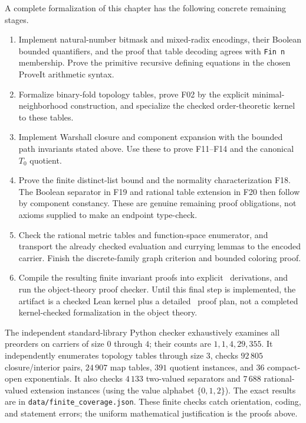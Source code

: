A complete formalization of this chapter has the following
concrete remaining stages.
\begin{enumerate}
\item Implement natural-number bitmask and mixed-radix encodings,
      their Boolean bounded quantifiers, and the proof that table
      decoding agrees with \texttt{Fin n} membership.  Prove the
      primitive recursive defining equations in the chosen
      ProveIt arithmetic syntax.
\item Formalize binary-fold topology tables, prove F02 by the
      explicit minimal-neighborhood construction, and specialize
      the checked order-theoretic kernel to these tables.
\item Implement Warshall closure and component expansion with the
      bounded path invariants stated above.  Use these to prove
      F11--F14 and the canonical $T_0$ quotient.
\item Prove the finite distinct-list bound and the normality
      characterization F18.  The Boolean separator in F19 and
      rational table extension in F20 then follow by component
      constancy.  These are genuine remaining proof obligations,
      not axioms supplied to make an endpoint type-check.
\item Check the rational metric tables and function-space
      enumerator, and transport the already checked evaluation
      and currying lemmas to the encoded carrier.  Finish the
      discrete-family graph criterion and bounded coloring proof.
\item Compile the resulting finite invariant proofs into explicit
      \ipra\ derivations, and run the object-theory proof checker.
      Until this final step is implemented, the artifact is a
      checked Lean kernel plus a detailed \ipra\ proof plan, not
      a completed kernel-checked formalization in the object theory.
\end{enumerate}

The independent standard-library Python checker exhaustively
examines all preorders on carriers of size $0$ through $4$;
their counts are $1,1,4,29,355$.  It independently enumerates
topology tables through size $3$, checks $92\,805$
closure/interior pairs, $24\,907$ map tables, $391$ quotient
instances, and $36$ compact-open exponentials.  It also checks
$4\,133$ two-valued separators and $7\,688$ rational-valued
extension instances (using the value alphabet $\{0,1,2\}$).
The exact results are in \texttt{data/finite\_coverage.json}.
These finite checks catch orientation, coding, and statement errors;
the uniform mathematical justification is the proofs above.
